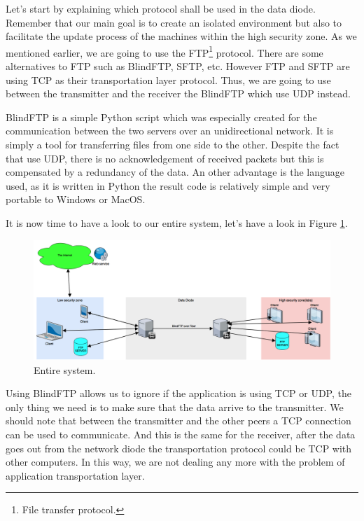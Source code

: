 \documentclass[a4paper,10pt]{article}
\begin{document}
Let's start by explaining which protocol shall be used in the data diode. Remember that our main goal is to create an isolated environment but also to facilitate the update process of the machines within the high security zone. As we mentioned earlier, we are going to use the FTP\footnote{File transfer protocol.} protocol. There are some alternatives to FTP such as BlindFTP, SFTP, etc. However FTP and SFTP are using TCP as their transportation layer protocol. Thus, we are going to use between the transmitter and the receiver the BlindFTP which use UDP instead.

BlindFTP is a simple Python script which was especially created for the communication between the two servers over an unidirectional network. It is simply a tool for transferring files from one side to the other. Despite the fact that use UDP, there is no acknowledgement of received packets but this is compensated by a redundancy of the data. An other advantage is the language used, as it is written in Python the result code is relatively simple and very portable to Windows or MacOS.

It is now time to have a look to our entire system, let's have a look in Figure \ref{fig:sysschem}.\bigskip

\begin{figure}
\centering
\includegraphics[scale=0.35]{images/systemschema.png}
\caption{Entire system.}
\label{fig:sysschem}
\end{figure}

Using BlindFTP allows us to ignore if the application is using TCP or UDP, the only thing we need is to make sure that the data arrive to the transmitter. We should note that between the transmitter and the other peers a TCP connection can be used to communicate. And this is the same for the receiver, after the data goes out from the network diode the transportation protocol could be TCP with other computers. In this way, we are not dealing any more with the problem of application transportation layer. 
\end{document}
